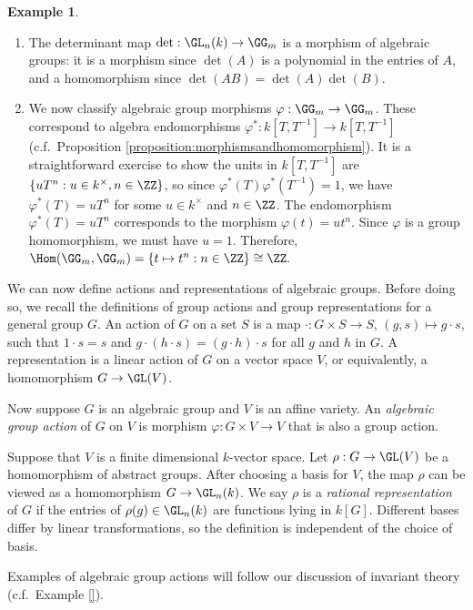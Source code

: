 \documentclass[12pt]{amsart}
\theoremstyle{plain}
\theoremstyle{definition}
\newtheorem{example}[theorem]{Example}
\begin{document}
\begin{example}\label{example:algebraicgroupmorphisms}
\begin{enumerate}
\item The determinant map $\det : \GL_n(k) \to \GG_m$ is a morphism of algebraic groups:
it is a morphism since $\det(A)$ is a polynomial in the entries of $A$, and a homomorphism since $\det(AB)=\det(A)\det(B)$.
\item We now classify algebraic group morphisms $\varphi : \GG_m \to \GG_m$.
These correspond to algebra endomorphisms $\varphi^* : k[T, T^{-1}] \to k[T, T^{-1}]$ (c.f.\ Proposition \ref{proposition:morphismsandhomomorphism}).
It is a straightforward exercise to show the units in $k[T,T^{-1}]$ are $\{u T^n : u \in k^\times, n \in \ZZ\}$, so since $\varphi^*(T)\varphi^*(T^{-1}) = 1$, we have $\varphi^*(T) = u T^n$ for some $u \in k^\times$ and $n \in \ZZ$.
The endomorphism $\varphi^*(T) = u T^n$ corresponds to the morphism $\varphi(t) = u t^n$.
Since $\varphi$ is a group homomorphism, we must have $u =1$.
Therefore, $\Hom(\GG_m, \GG_m) = \{t \mapsto t^n : n \in \ZZ\}\cong\ZZ.$
\end{enumerate}
\end{example}

We can now define actions and representations of algebraic groups.
Before doing so, we recall the definitions of group actions and group representations for a general group $G$.
An action of $G$ on a set $S$ is a map $\cdot : G \times S \to S$, $(g, s) \mapsto g \cdot s$, such that $1 \cdot s = s$ and $g \cdot (h \cdot s) = (g\cdot h) \cdot s$ for all $g$ and $h$ in $G$.
A representation is a linear action of $G$ on a vector space $V$, or equivalently, a homomorphism $G \to \GL(V)$.

Now suppose $G$ is an algebraic group and $V$ is an affine variety.
An \emph{algebraic group action} of $G$ on $V$ is morphism $\varphi : G \times V \to V$ that is also a group action.

Suppose that $V$ is a finite dimensional $k$-vector space.
Let $\rho : G \to \GL(V)$ be a homomorphism of abstract groups.
After choosing a basis for $V$, the map $\rho$ can be viewed as a homomorphism $G \to \GL_n(k)$.
We say $\rho$ is a \emph{rational representation} of $G$ if the entries of $\rho(g) \in \GL_n(k)$ are functions lying in $k[G]$.
Different bases differ by linear transformations, so the definition is independent of the choice of basis.

Examples of algebraic group actions will follow our discussion of invariant theory (c.f.\ Example \ref{}).
\end{document}

